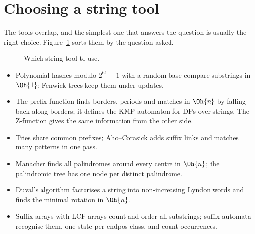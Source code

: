 \section[Choosing a string tool]{Choosing a string tool \hfill \gold}\label{sec:stringtools}

The tools overlap, and the simplest one that answers the question is usually the right choice. Figure~\ref{fig:stringflow} sorts them
by the question asked.

\begin{figure}[htbp]
\centering
{}
\caption{Which string tool to use.}
\label{fig:stringflow}
\end{figure}

\begin{summary}
\begin{itemize}
  \item Polynomial hashes modulo $2^{61} - 1$ with a random base compare substrings in $\Oh{1}$; Fenwick trees keep them under updates.
  \item The prefix function finds borders, periods and matches in $\Oh{n}$ by falling back along borders; it defines the KMP automaton
        for DPs over strings. The Z-function gives the same information from the other side.
  \item Tries share common prefixes; Aho--Corasick adds suffix links and matches many patterns in one pass.
  \item Manacher finds all palindromes around every centre in $\Oh{n}$; the palindromic tree has one node per distinct palindrome.
  \item Duval's algorithm factorises a string into non-increasing Lyndon words and finds the minimal rotation in $\Oh{n}$.
  \item Suffix arrays with LCP arrays count and order all substrings; suffix automata recognise them, one state per endpos class, and
        count occurrences.
\end{itemize}
\end{summary}

